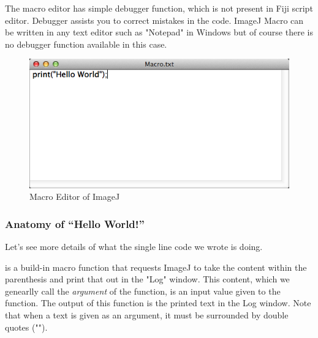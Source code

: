 The macro editor has simple debugger function, which is not present in Fiji script editor. Debugger assists you to correct mistakes in the code. ImageJ Macro can be written in any text editor such as "Notepad" in Windows but of course there is no debugger function available in this case.

\begin{figure}[htbp]
\begin{center}
\includegraphics[scale=0.6]{fig/editor_helloworld_IJ_simple.png}
\caption{Macro Editor of ImageJ} \label{fig_MacroEditor}
\end{center}
\end{figure}


\subsubsection{Anatomy of ``Hello World!''}

Let's see more details of what the single line code we wrote is doing.

 is a build-in macro function that requests ImageJ to take the content within the parenthesis and print that out in the "Log" window. This content, which we genearlly call the \textit{argument} of the function, is an input value given to the function. The output of this function is the printed text in the Log window. Note that when a text is given as an argument, it must be surrounded by double quotes ("").
 
